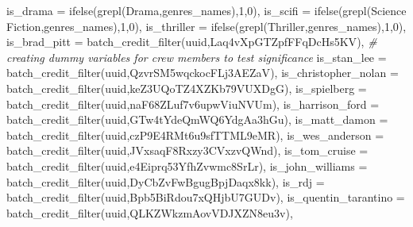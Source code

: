 \documentclass[
]{article}
\newenvironment{Shaded}{\begin{snugshade}}{\end{snugshade}}
\newcommand{\AttributeTok}[1]{\textcolor[rgb]{0.77,0.63,0.00}{#1}}
\newcommand{\CommentTok}[1]{\textcolor[rgb]{0.56,0.35,0.01}{\textit{#1}}}
\newcommand{\DecValTok}[1]{\textcolor[rgb]{0.00,0.00,0.81}{#1}}
\newcommand{\FunctionTok}[1]{\textcolor[rgb]{0.00,0.00,0.00}{#1}}
\newcommand{\NormalTok}[1]{#1}
\newcommand{\StringTok}[1]{\textcolor[rgb]{0.31,0.60,0.02}{#1}}
\begin{document}
\begin{Shaded}
\begin{Highlighting}[]
    \AttributeTok{is\_drama =} \FunctionTok{ifelse}\NormalTok{(}\FunctionTok{grepl}\NormalTok{(}\StringTok{\textquotesingle{}Drama\textquotesingle{}}\NormalTok{,genres\_names),}\DecValTok{1}\NormalTok{,}\DecValTok{0}\NormalTok{),}
    \AttributeTok{is\_scifi =} \FunctionTok{ifelse}\NormalTok{(}\FunctionTok{grepl}\NormalTok{(}\StringTok{\textquotesingle{}Science Fiction\textquotesingle{}}\NormalTok{,genres\_names),}\DecValTok{1}\NormalTok{,}\DecValTok{0}\NormalTok{),}
    \AttributeTok{is\_thriller =} \FunctionTok{ifelse}\NormalTok{(}\FunctionTok{grepl}\NormalTok{(}\StringTok{\textquotesingle{}Thriller\textquotesingle{}}\NormalTok{,genres\_names),}\DecValTok{1}\NormalTok{,}\DecValTok{0}\NormalTok{),}
    \AttributeTok{is\_brad\_pitt =} \FunctionTok{batch\_credit\_filter}\NormalTok{(uuid,}\StringTok{\textquotesingle{}Laq4vXpGTZpfFFqDcHs5KV\textquotesingle{}}\NormalTok{), }\CommentTok{\# creating dummy variables for crew members to test significance}
    \AttributeTok{is\_stan\_lee =} \FunctionTok{batch\_credit\_filter}\NormalTok{(uuid,}\StringTok{\textquotesingle{}QzvrSM5wqckocFLj3AEZaV\textquotesingle{}}\NormalTok{),}
    \AttributeTok{is\_christopher\_nolan =} \FunctionTok{batch\_credit\_filter}\NormalTok{(uuid,}\StringTok{\textquotesingle{}keZ3UQoTZ4XZKb79VUXDgG\textquotesingle{}}\NormalTok{),}
    \AttributeTok{is\_spielberg =} \FunctionTok{batch\_credit\_filter}\NormalTok{(uuid,}\StringTok{\textquotesingle{}naF68ZLuf7v6upwViuNVUm\textquotesingle{}}\NormalTok{),}
    \AttributeTok{is\_harrison\_ford =} \FunctionTok{batch\_credit\_filter}\NormalTok{(uuid,}\StringTok{\textquotesingle{}GTw4tYdeQmWQ6YdgAa3hGu\textquotesingle{}}\NormalTok{),}
    \AttributeTok{is\_matt\_damon =} \FunctionTok{batch\_credit\_filter}\NormalTok{(uuid,}\StringTok{\textquotesingle{}czP9E4RMt6u9sfTTML9eMR\textquotesingle{}}\NormalTok{),}
    \AttributeTok{is\_wes\_anderson =} \FunctionTok{batch\_credit\_filter}\NormalTok{(uuid,}\StringTok{\textquotesingle{}JVxsaqF8Rxzy3CVxzvQWnd\textquotesingle{}}\NormalTok{),}
    \AttributeTok{is\_tom\_cruise =} \FunctionTok{batch\_credit\_filter}\NormalTok{(uuid,}\StringTok{\textquotesingle{}e4Eiprq53YfhZvwmc8SrLr\textquotesingle{}}\NormalTok{),}
    \AttributeTok{is\_john\_williams =} \FunctionTok{batch\_credit\_filter}\NormalTok{(uuid,}\StringTok{\textquotesingle{}DyCbZvFwBgugBpjDaqx8kk\textquotesingle{}}\NormalTok{),}
    \AttributeTok{is\_rdj =} \FunctionTok{batch\_credit\_filter}\NormalTok{(uuid,}\StringTok{\textquotesingle{}Bpb5BiRdou7xQHjbU7GUDv\textquotesingle{}}\NormalTok{),}
    \AttributeTok{is\_quentin\_tarantino =} \FunctionTok{batch\_credit\_filter}\NormalTok{(uuid,}\StringTok{\textquotesingle{}QLKZWkzmAovVDJXZN8eu3v\textquotesingle{}}\NormalTok{),}

\end{Highlighting}
\end{Shaded}
\end{document}
